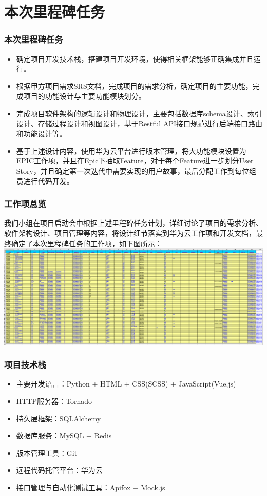 \section{本次里程碑任务}
\begin{frame}
    \frametitle{本次里程碑任务}
    \begin{itemize}
        \item 确定项目开发技术栈，搭建项目开发环境，使得相关框架能够正确集成并且运行。
        \item 根据甲方项目需求SRS文档，完成项目的需求分析，确定项目的主要功能，完成项目的功能设计与主要功能模块划分。
        \item 完成项目软件架构的逻辑设计和物理设计，主要包括数据库schema设计、索引设计、存储过程设计和视图设计，基于Restful API接口规范进行后端接口路由和功能设计等。
        \item 基于上述设计内容，使用华为云平台进行版本管理，将大功能模块设置为EPIC工作项，并且在Epic下抽取Feature，对于每个Feature进一步划分User Story，并且确定第一次迭代中需要实现的用户故事，最后分配工作到每位组员进行代码开发。
    \end{itemize}
\end{frame}

\begin{frame}
    \frametitle{工作项总览}
    我们小组在项目启动会中根据上述里程碑任务计划，详细讨论了项目的需求分析、软件架构设计、项目管理等内容，将设计细节落实到华为云工作项和开发文档，最终确定了本次里程碑任务的工作项，如下图所示：
        \includegraphics[width=2\textwidth]{contents/figure/work_items_overall.png}
\end{frame}


\begin{frame}
    \frametitle{项目技术栈}
    \begin{itemize}
        \item 主要开发语言：Python + HTML + CSS(SCSS) + JavaScript(Vue.js)
        \item HTTP服务器：Tornado
        \item 持久层框架：SQLAlchemy
        \item 数据库服务：MySQL + Redis
        \item 版本管理工具：Git
        \item 远程代码托管平台：华为云
        \item 接口管理与自动化测试工具：Apifox + Mock.js
    \end{itemize}
\end{frame}